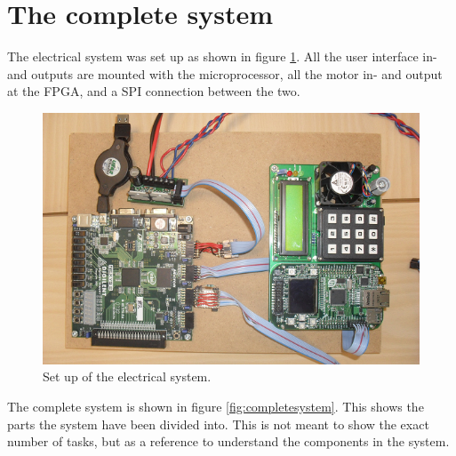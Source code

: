 \section{The complete system}

The electrical system was set up as shown in figure \ref{fig:digitalsystem}. All the user interface in- and outputs are mounted with the microprocessor, all the motor in- and output at the FPGA, and a SPI connection between the two.

\begin{figure}[htb]
	\centering
	\includegraphics[width=\textwidth]{graphics/digitalsystem.png} %
	\caption{Set up of the electrical system.}
	\label{fig:digitalsystem}			%
\end{figure}


The complete system is shown in figure \ref{fig:completesystem}. This shows the parts the system have been divided into. This is not meant to show the exact number of tasks, but as a reference to understand the components in the system.


